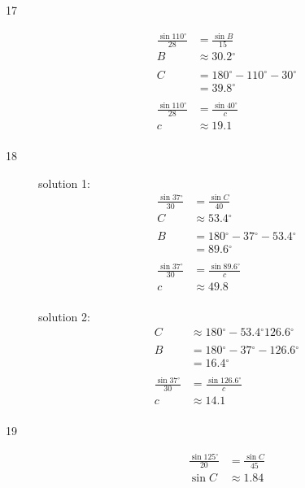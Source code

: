 \documentclass{exam}
\newcommand{\dg}{\ensuremath{^\circ}}
\begin{document}
\begin{description}
      \item[17] 
        \begin{align*}
          \frac{\sin 110 \dg}{28} & = \frac{\sin B}{15} \\
          B                       & \approx \boxed{ 30.2 \dg } \\
          \\
          C & = 180 \dg - 110 \dg - 30 \dg \\
            & = \boxed{ 39.8 \dg } \\
          \\
          \frac{\sin 110 \dg}{28} & = \frac{\sin 40 \dg}{c} \\
          c                       & \approx \boxed{ 19.1 } \\
        \end{align*}

      \item[18] 
        solution 1:
        \begin{align*}
          \frac{\sin 37 \dg}{30} & = \frac{\sin C}{40} \\
          C                      & \approx \boxed{ 53.4 \dg } \\
          \\
          B & = 180 \dg - 37 \dg - 53.4 \dg \\
            & = \boxed{ 89.6 \dg } \\
          \\
          \frac{\sin 37 \dg}{30} & = \frac{\sin 89.6 \dg}{c} \\
          c                      & \approx \boxed{ 49.8 } \\
        \end{align*}

        solution 2:
        \begin{align*}
          C & \approx 180 \dg - 53.4 \dg \boxed{ 126.6 \dg } \\
          \\
          B & = 180 \dg - 37 \dg - 126.6 \dg \\
            & = \boxed{ 16.4 \dg } \\
          \\
          \frac{\sin 37 \dg}{30} & = \frac{\sin 126.6 \dg}{c} \\
          c                      & \approx \boxed{ 14.1 } \\
        \end{align*}

      \item[19] 
        \begin{align*}
          \frac{\sin 125 \dg}{20} & = \frac{\sin C}{45} \\
          \sin C                  & \approx 1.84 \\
        \end{align*}


\end{description}
\end{document}
